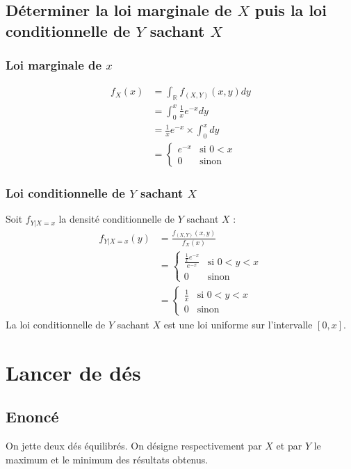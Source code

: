 \documentclass[10pt,a4paper,twoside]{article}
\begin{document}
\subsection{Déterminer la loi marginale de $X$ puis la loi conditionnelle de $Y$ sachant $X$}
\subsubsection{Loi marginale de $x$}
\begin{align*}
f_{X}(x) &= \int_{\mathbb{R}}f_{(X,Y)}(x,y) dy \\
&= \int_{0}^{x} \frac{1}{x}e^{-x} dy\\
&= \frac{1}{x}e^{-x} \times \int_{0}^{x}dy\\
&= \left\lbrace \begin{array}{ll}
e^{-x} & \text{si }0<x\\
0 & \text{sinon}
\end{array}\right.
\end{align*}

\subsubsection{Loi conditionnelle de $Y$ sachant $X$}
Soit $f_{Y|X=x}$ la densité conditionnelle de $Y$ sachant $X$ :
\begin{align*}
f_{Y|X=x}(y) &= \frac{f_{(X,Y)}(x,y)}{f_{X}(x)}\\
&= \left\lbrace \begin{array}{ll}
\frac{\frac{1}{x}e^{-x}}{e^{-x}} & \text{si }0<y<x\\
0 & \text{sinon}
\end{array}\right.\\
&= \left\lbrace \begin{array}{ll}
\frac{1}{x} & \text{si }0<y<x\\
0 & \text{sinon}
\end{array}\right.
\end{align*}
La loi conditionnelle de $Y$ sachant $X$ est une loi uniforme sur l'intervalle $[0,x]$.

\section{Lancer de dés}
\subsection*{Enoncé}
On jette deux dés équilibrés. On désigne respectivement par $X$ et par $Y$ le maximum et le minimum des résultats obtenus.
\end{document}
